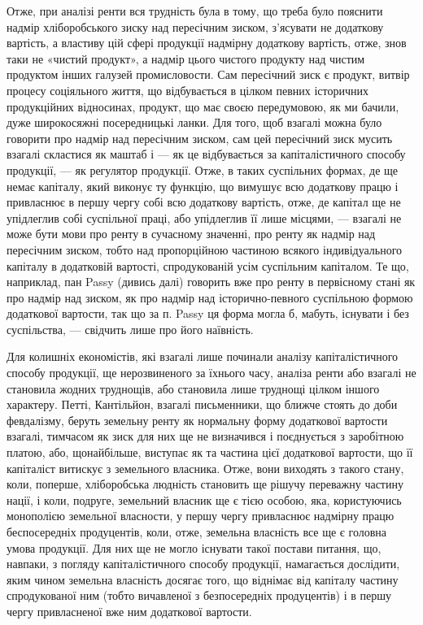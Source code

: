 Отже, при аналізі ренти вся трудність була в тому, що треба було
пояснити надмір хліборобського зиску над пересічним зиском, з’ясувати не додаткову
вартість, а властиву цій сфері продукції надмірну додаткову вартість,
отже, знов таки не «чистий продукт», а надмір цього чистого продукту над
чистим продуктом інших галузей промисловости. Сам пересічний зиск є продукт,
витвір процесу соціяльного життя, що відбувається в цілком певних історичних
продукційних відносинах, продукт, що має своєю передумовою, як ми
бачили, дуже широкосяжні посередницькі ланки. Для того, щоб взагалі можна було
говорити про надмір над пересічним зиском, сам цей пересічний зиск мусить
взагалі скластися як маштаб і — як це відбувається за капіталістичного способу
продукції, — як регулятор продукції. Отже, в таких суспільних формах, де ще
немає капіталу, який виконує ту функцію, що вимушує всю додаткову працю
і привласнює в першу чергу собі всю додаткову вартість, отже, де капітал ще
не упідлеглив собі суспільної праці, або упідлеглив її лише місцями, — взагалі
не може бути мови про ренту в сучасному значенні, про ренту як надмір
над пересічним зиском, тобто над пропорційною частиною всякого індивідуального
капіталу в додатковій вартості, спродукованій усім суспільним капіталом. Те
що, наприклад, пан Passy (дивись далі) говорить вже про ренту в первісному стані
як про надмір над зиском, як про надмір над історично-певного суспільною
формою додаткової вартости, так що за п. Passy ця форма могла б, мабуть,
існувати і без суспільства, — свідчить лише про його наївність.

Для колишніх економістів, які взагалі лише починали аналізу капіталістичного
способу продукції, ще нерозвиненого за їхнього часу, аналіза ренти
або взагалі не становила жодних труднощів, або становила лише труднощі цілком
іншого характеру. Петті, Кантільйон, взагалі письменники, що ближче стоять
до доби февдалізму, беруть земельну ренту як нормальну форму додаткової
вартости взагалі, тимчасом як зиск для них ще не визначився і поєднується
з заробітною платою, або, щонайбільше, виступає як та частина цієї
додаткової вартости, що її капіталіст витискує з земельного власника. Отже, вони
виходять з такого стану, коли, поперше, хліборобська людність становить ще рішучу
переважну частину нації, і коли, подруге, земельний власник ще є тією
особою, яка, користуючись монополією земельної власности, у першу чергу привласнює
надмірну працю беспосередніх продуцентів, коли, отже, земельна власність
все ще є головна умова продукції. Для них ще не могло існувати такої
постави питання, що, навпаки, з погляду капіталістичного способу продукції,
намагається дослідити, яким чином земельна власність досягає того, що
віднімає від капіталу частину спродукованої ним (тобто вичавленої з безпосередніх
продуцентів) і в першу чергу привласненої вже ним додаткової вартости.


